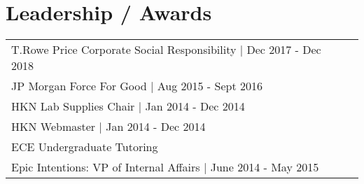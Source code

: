 \documentclass[letterpaper]{deedy-resume-openfont} %
\begin{document}
\begin{minipage}[t]{0.66\textwidth}








\section{Leadership / Awards} 

\begin{tabular}{lll}
T.Rowe Price Corporate Social Responsibility | Dec 2017 - Dec 2018 \\
JP Morgan Force For Good | Aug 2015 - Sept 2016 \\
HKN Lab Supplies Chair | Jan 2014 - Dec 2014 \\
HKN Webmaster | Jan 2014 - Dec 2014 \\
ECE Undergraduate Tutoring\\
Epic Intentions: VP of Internal Affairs | June 2014 - May 2015 \\
\end{tabular}





\end{minipage} %
\end{document}
